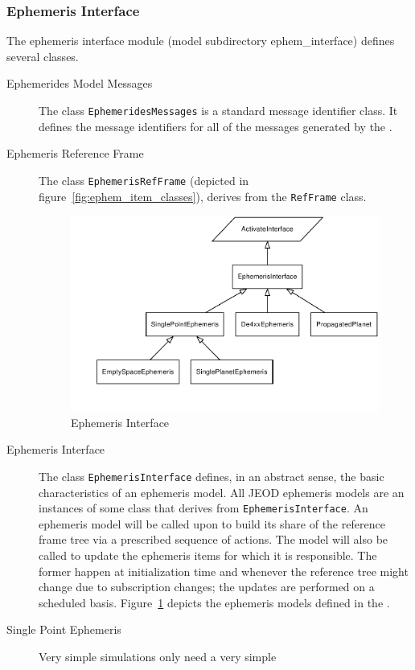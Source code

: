 \subsubsection{Ephemeris Interface}
The ephemeris interface module (model subdirectory ephem\_interface)
defines several classes.\begin{description}
\item[Ephemerides Model Messages] The class \texttt{EphemeridesMessages} is a
standard message identifier class. It defines the message identifiers for all
of the messages generated by the \ModelDesc.
\item[Ephemeris Reference Frame] The class \texttt{EphemerisRefFrame}
(depicted in figure~\ref{fig:ephem_item_classes}), derives from the
\texttt{RefFrame} class. 
\begin{figure}[hbtp]
\centering
\includegraphics{ephem_interface}
\caption{Ephemeris Interface}
\label{fig:ephem_interface_classes}
\end{figure}
\item[Ephemeris Interface] The class \texttt{EphemerisInterface} defines,
in an abstract sense, the basic characteristics of an ephemeris model.
All JEOD ephemeris models are an instances of some class that derives from
\texttt{EphemerisInterface}.
An ephemeris model will be called upon to build its share of the reference frame
tree via a prescribed sequence of actions. The model will also be called
to update the ephemeris items for which it is responsible.
The former happen at initialization time and whenever the reference tree might
change due to subscription changes; the updates are performed on a
scheduled basis.
Figure~\ref{fig:ephem_interface_classes} depicts the ephemeris models
defined in the \ModelDesc.
\item[Single Point Ephemeris] Very simple simulations only need a very simple

\end{description}
